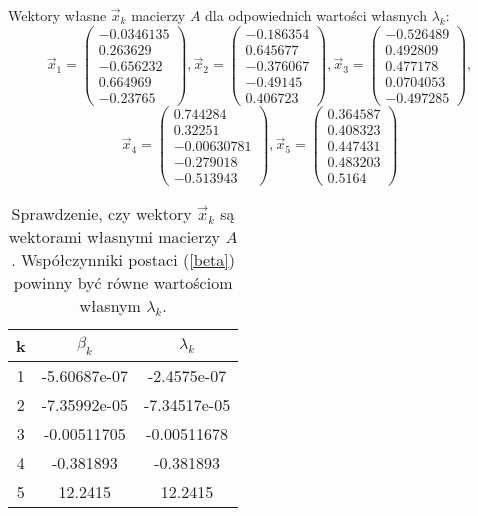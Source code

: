 Wektory własne $ \vec{x}_k $ macierzy $ A $ dla odpowiednich wartości własnych $ \lambda_k $:
\begin{equation*}
\vec{x}_1 = 
\begin{pmatrix}
-0.0346135  \\ 0.263629 \\ -0.656232\\0.664969 \\ -0.23765
\end{pmatrix},
\vec{x}_2 = 
\begin{pmatrix}
-0.186354  \\ 0.645677 \\ -0.376067 \\-0.49145  \\ 	0.406723
\end{pmatrix},
\vec{x}_3 = 
\begin{pmatrix}
-0.526489 \\0.492809  \\ 0.477178 \\0.0704053  \\ 	-0.497285
\end{pmatrix},
\end{equation*}
\begin{equation*}
\vec{x}_4 = 
\begin{pmatrix}
0.744284  \\0.32251  \\ -0.00630781 \\-0.279018  \\ -0.513943 
\end{pmatrix},
\vec{x}_5 = 
\begin{pmatrix}
0.364587 \\0.408323 \\0.447431  \\0.483203 \\0.5164 
\end{pmatrix}
\end{equation*}

\begin{table}[!hb]
	\centering
	\begin{tabular}{|c|c|c|}
		\hline
		k & $ \beta_k $& $ \lambda_k $  \\ \hline
		1&-5.60687e-07 & -2.4575e-07 \\ \hline
		2&-7.35992e-05 & -7.34517e-05 \\ \hline
		3&-0.00511705 & -0.00511678 \\ \hline
		4&-0.381893 & -0.381893 \\ \hline
		5&12.2415 & 12.2415 \\ \hline
	\end{tabular}
	\caption{Sprawdzenie, czy wektory $ \vec{x}_k $ są wektorami własnymi macierzy $ A $. Współczynniki postaci (\ref{beta}) powinny być równe wartościom własnym $ \lambda_k $.}
	\label{tabela}
\end{table}

